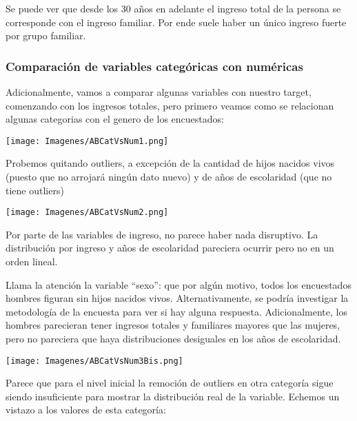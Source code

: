 \documentclass[a4paper]{article}
\begin{document}
            Se puede ver que desde los 30 años en adelante el ingreso total de la persona se corresponde con el ingreso familiar. Por ende suele haber un único ingreso fuerte por grupo familiar.
 
        \subsubsection{Comparación de variables categóricas con numéricas}
 
            Adicionalmente, vamos a comparar algunas variables con nuestro target, comenzando con los ingresos totales, pero primero veamos como se relacionan algunas categorias con el genero de los encuestados:
 
            \begin{center}
                \texttt{[image: Imagenes/ABCatVsNum1.png]}
            \end{center}
 
            Probemos quitando outliers, a excepción de la cantidad de hijos nacidos vivos (puesto que no arrojará ningún dato nuevo) y de años de escolaridad (que no tiene outliers)
 
            \begin{center}
                \texttt{[image: Imagenes/ABCatVsNum2.png]}
            \end{center}
 
            Por parte de las variables de ingreso, no parece haber nada disruptivo. La distribución por ingreso y años de escolaridad pareciera ocurrir pero no en un orden lineal.
 
            Llama la atención la variable ``sexo'': que por algún motivo, todos los encuestados hombres figuran sin hijos nacidos vivos. Alternativamente, se podría investigar la metodología de la encuesta para ver si hay alguna respuesta. Adicionalmente, los hombres parecieran tener ingresos totales y familiares mayores que las mujeres, pero no pareciera que haya distribuciones desiguales en los años de escolaridad.
 
            \begin{center}
                \texttt{[image: Imagenes/ABCatVsNum3Bis.png]}
            \end{center}
 
            Parece que para el nivel inicial la remoción de outliers en otra categoría sigue siendo insuficiente para mostrar la distribución real de la variable. Echemos un vistazo a los valores de esta categoría:
 
\end{document}
